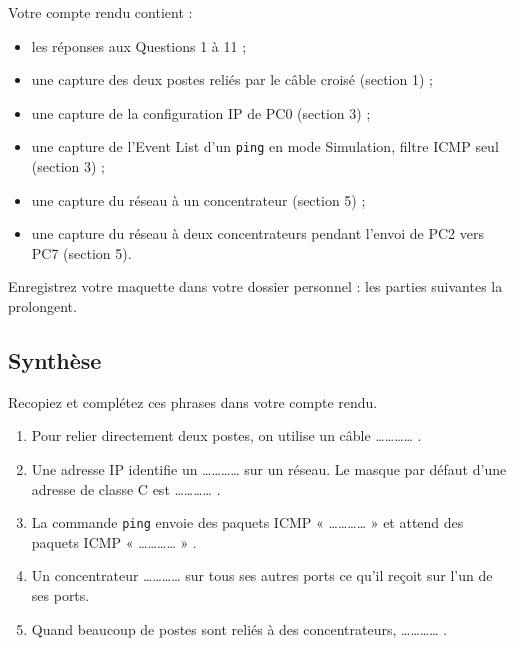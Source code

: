 \documentclass[
  french,
  10pt,
  a4paper,
]{scrartcl}
\providecommand{\tightlist}{%
  \setlength{\itemsep}{0pt}\setlength{\parskip}{0pt}}
\begin{document}
Votre compte rendu contient :

\begin{itemize}
\tightlist
\item
  les réponses aux Questions 1 à 11 ;
\item
  une capture des deux postes reliés par le câble croisé (section 1) ;
\item
  une capture de la configuration IP de PC0 (section 3) ;
\item
  une capture de l'Event List d'un \texttt{ping} en mode Simulation,
  filtre ICMP seul (section 3) ;
\item
  une capture du réseau à un concentrateur (section 5) ;
\item
  une capture du réseau à deux concentrateurs pendant l'envoi de PC2
  vers PC7 (section 5).
\end{itemize}

Enregistrez votre maquette dans votre dossier personnel : les parties
suivantes la prolongent.

\subsection{Synthèse}\label{synthuxe8se}

\begin{tcolorbox}[enhanced jigsaw, arc=.35mm, bottomrule=.15mm, bottomtitle=1mm, breakable, colback=white, colbacktitle=quarto-callout-important-color!10!white, colframe=quarto-callout-important-color-frame, coltitle=black, left=2mm, leftrule=.75mm, opacityback=0, opacitybacktitle=0.6, rightrule=.15mm, title=\textcolor{quarto-callout-important-color}{\faExclamation}\hspace{0.5em}{Synthèse à compléter}, titlerule=0mm, toprule=.15mm, toptitle=1mm]

Recopiez et complétez ces phrases dans votre compte rendu.

\begin{enumerate}
\def\labelenumi{\arabic{enumi}.}
\tightlist
\item
  Pour relier directement deux postes, on utilise un câble
  \ldots\ldots\ldots\ldots{} .
\item
  Une adresse IP identifie un \ldots\ldots\ldots\ldots{} sur un réseau.
  Le masque par défaut d'une adresse de classe C est
  \ldots\ldots\ldots\ldots{} .
\item
  La commande \texttt{ping} envoie des paquets ICMP «
  \ldots\ldots\ldots\ldots{} » et attend des paquets ICMP «
  \ldots\ldots\ldots\ldots{} » .
\item
  Un concentrateur \ldots\ldots\ldots\ldots{} sur tous ses autres ports
  ce qu'il reçoit sur l'un de ses ports.
\item
  Quand beaucoup de postes sont reliés à des concentrateurs,
  \ldots\ldots\ldots\ldots{} .
\end{enumerate}

\end{tcolorbox}
\end{document}
